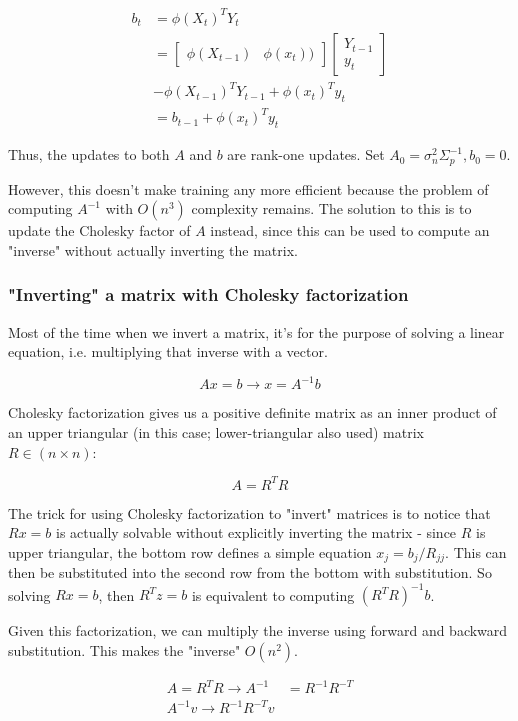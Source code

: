 \documentclass[a4paper]{article}
\begin{document}
\begin{align*}
b_t &= \phi(X_t)^T Y_t  \\
&= \begin{bmatrix} \phi(X_{t-1}) & \phi(x_t)) \end{bmatrix} \begin{bmatrix} Y_{t-1}\\ y_t \end{bmatrix} \\
&- \phi(X_{t-1})^T Y_{t-1} + \phi(x_t)^T y_t \\
&= b_{t-1} + \phi(x_t)^T y_t
\end{align*}

Thus, the updates to both $A$ and $b$ are rank-one updates. Set $A_0 = \sigma_n^2 \Sigma_p^{-1}, b_0=0$. 

However, this doesn't make training any more efficient because the problem of computing $A^{-1}$ with $O(n^3)$ complexity remains. The solution to this is to update the Cholesky factor of $A$ instead, since this can be used to compute an "inverse" without actually inverting the matrix. 


\subsubsection*{"Inverting" a matrix with Cholesky factorization}

Most of the time when we invert a matrix, it's for the purpose of solving a linear equation, i.e. multiplying that inverse with a vector. 

$$Ax=b \rightarrow x = A^{-1}b$$

Cholesky factorization gives us a positive definite matrix as an inner product of an upper triangular (in this case; lower-triangular also used) matrix $R\in (n \times n)$: 

$$A=R^T R$$

The trick for using Cholesky factorization to "invert" matrices is to notice that $Rx=b$ is actually solvable without explicitly inverting the matrix - since $R$ is upper triangular, the bottom row defines a simple equation $x_j=b_j/R_{jj}$. This can then be substituted into the second row from the bottom with substitution. So solving $Rx=b$, then $R^T z = b$ is equivalent to computing $(R^T R)^{-1}b$. 

Given this factorization, we can multiply the inverse using forward and backward substitution. This makes the "inverse" $O(n^2)$.

\begin{align*}
A = R^T R \rightarrow A^{-1} &= R^{-1}R^{-T} \\
A^{-1} v \rightarrow R^{-1}R^{-T} v
\end{align*}
\end{document}
